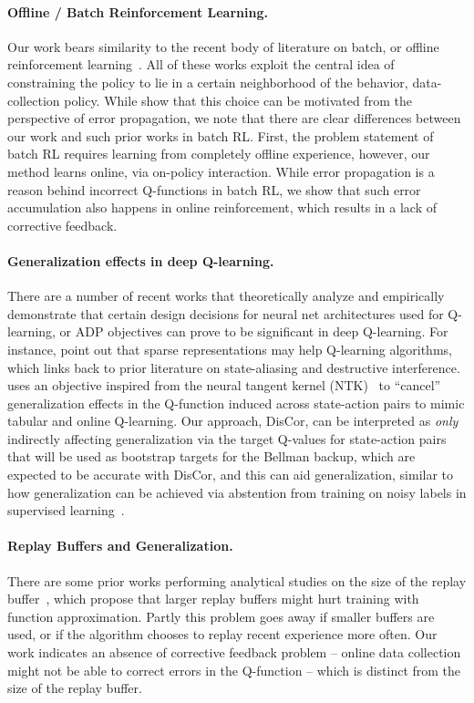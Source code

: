 \documentclass[jmlr]{article}
\begin{document}
\paragraph{Offline / Batch Reinforcement Learning.} Our work bears similarity to the recent body of literature on batch, or offline reinforcement learning~\citep{kumar19bear,fujimoto19a,wu2019behavior}. All of these works exploit the central idea of constraining the policy to lie in a certain neighborhood of the behavior, data-collection policy. While \cite{kumar19bear} show that this choice can be motivated from the perspective of error propagation, we note that there are clear differences between our work and such prior works in batch RL. First, the problem statement of batch RL requires learning from completely offline experience, however, our method learns online, via on-policy interaction. While error propagation is a reason behind incorrect Q-functions in batch RL, we show that such error accumulation also happens in online reinforcement, which results in a lack of corrective feedback.  

\paragraph{Generalization effects in deep Q-learning.} There are a number of recent works that theoretically analyze and empirically demonstrate that certain design decisions for neural net architectures used for Q-learning, or ADP objectives can prove to be significant in deep Q-learning. For instance, \cite{martha2018sparse} point out that sparse representations may help Q-learning algorithms, which links back to prior literature on state-aliasing and destructive interference. \cite{Achiam2019TowardsCD} uses an objective inspired from the neural tangent kernel (NTK)~\citep{ntk} to ``cancel'' generalization effects in the Q-function induced across state-action pairs to mimic tabular and online Q-learning. Our approach, DisCor, can be interpreted as \textit{only} indirectly affecting generalization via the target Q-values for state-action pairs that will be used as bootstrap targets for the Bellman backup, which are expected to be accurate with DisCor, and this can aid generalization, similar to how generalization can be achieved via abstention from training on noisy labels in supervised learning~\citep{absention}.

\paragraph{Replay Buffers and Generalization.} There are some prior works performing analytical studies on the size of the replay buffer~\citep{zhang2017deeper,liu2018effects}, which propose that larger replay buffers might hurt training with function approximation. Partly this problem goes away if smaller buffers are used, or if the algorithm chooses to replay recent experience more often. Our work indicates an absence of corrective feedback problem -- online data collection might not be able to correct errors in the Q-function -- which is distinct from the size of the replay buffer.   
\end{document}
